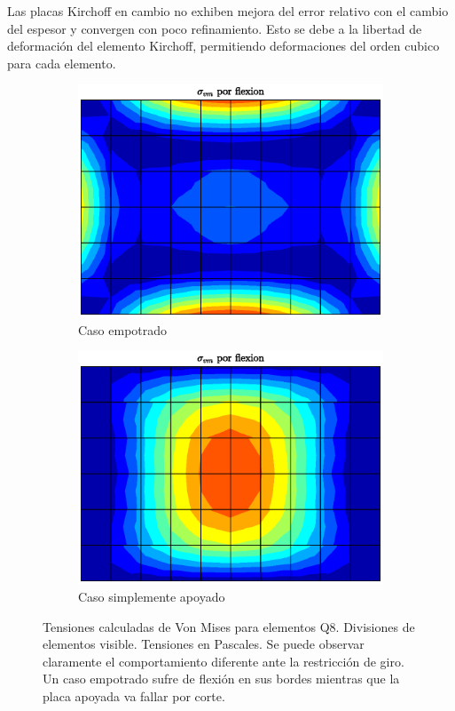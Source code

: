 \documentclass[onecolumn,10pt,titlepage]{article}
\begin{document}
Las placas Kirchoff en cambio no exhiben mejora del error relativo con el cambio del espesor y convergen con poco refinamiento. Esto se debe a la libertad de deformación del elemento Kirchoff, permitiendo deformaciones del orden cubico para cada elemento.




 \begin{figure}[htb!]
 \centering
 \begin{subfigure}{0.49\textwidth}
 \includegraphics[width=\linewidth]{fig/VM.eps}
 \caption{Caso empotrado}
 \label{fig:VMempotrado}
 \end{subfigure}
 \begin{subfigure}{0.49\textwidth}
 \includegraphics[width=\linewidth]{fig/VMapoyado.eps}
 \caption{Caso simplemente apoyado}
 \label{fig:VMapoyado}
 \end{subfigure}
 \caption{Tensiones calculadas de Von Mises para elementos Q8. Divisiones de elementos visible. Tensiones en Pascales. Se puede observar claramente el comportamiento diferente ante la restricción de giro. Un caso empotrado sufre de flexión en sus bordes mientras que la placa apoyada va fallar por corte.}
 \label{fig:VM}
 \end{figure}
\end{document}
